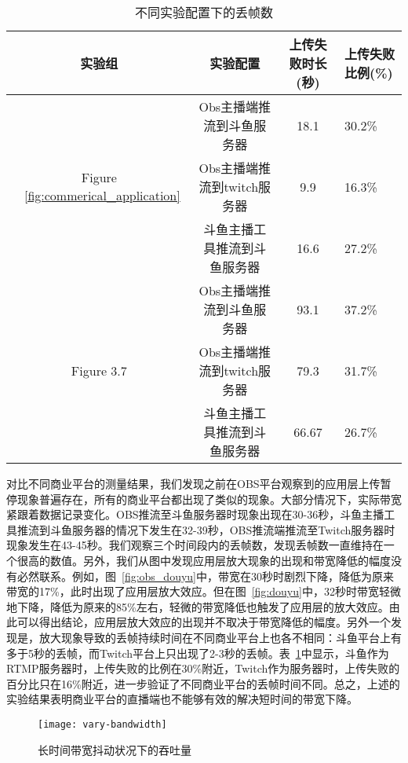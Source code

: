 \begin{table}[h]
\centering
\caption{不同实验配置下的丢帧数}
\label{tb:drop}
{\setlength{\tabcolsep}{4pt}
\begin{tabular}{|c|c|c|l|}
\hline
\textbf{实验组} & \textbf{实验配置} & \textbf{上传失败时长(秒)} & \textbf{上传失败比例(\%)}   \\ \hline
\multirow{3}{*}{Figure ~\ref{fig:commerical_application}}&  Obs主播端推流到斗鱼服务器               & 18.1         & 30.2\%                           \\ \cline{2-4}
& Obs主播端推流到twitch服务器              & 9.9        & 16.3\%    \\ \cline{2-4}
& 斗鱼主播工具推流到斗鱼服务器            & 16.6      & 27.2\% \\ \hline
\multirow{4}{*}{Figure 3.7} & Obs主播端推流到斗鱼服务器            & 93.1      & 37.2\%     \\ \cline{2-4}
& Obs主播端推流到twitch服务器             & 79.3      & 31.7\%  \\ \cline{2-4}
& 斗鱼主播工具推流到斗鱼服务器              & 66.67         & 26.7\%  \\ \hline
\end{tabular}}
\end{table}

对比不同商业平台的测量结果，我们发现之前在OBS平台观察到的应用层上传暂停现象普遍存在，所有的商业平台都出现了类似的现象。大部分情况下，实际带宽紧跟着数据记录变化。OBS推流至斗鱼服务器时现象出现在30-36秒，斗鱼主播工具推流到斗鱼服务器的情况下发生在32-39秒，OBS推流端推流至Twitch服务器时现象发生在43-45秒。我们观察三个时间段内的丢帧数，发现丢帧数一直维持在一个很高的数值。另外，我们从图中发现应用层放大现象的出现和带宽降低的幅度没有必然联系。例如，图~\ref{fig:obs_douyu}中，带宽在30秒时剧烈下降，降低为原来带宽的17\%，此时出现了应用层放大效应。但在图~\ref{fig:douyu}中，32秒时带宽轻微地下降，降低为原来的85\%左右，轻微的带宽降低也触发了应用层的放大效应。由此可以得出结论，应用层放大效应的出现并不取决于带宽降低的幅度。另外一个发现是，放大现象导致的丢帧持续时间在不同商业平台上也各不相同：斗鱼平台上有多于5秒的丢帧，而Twitch平台上只出现了2-3秒的丢帧。表~\ref{tb:drop}中显示，斗鱼作为RTMP服务器时，上传失败的比例在30\%附近，Twitch作为服务器时，上传失败的百分比只在16\%附近，进一步验证了不同商业平台的丢帧时间不同。总之，上述的实验结果表明商业平台的直播端也不能够有效的解决短时间的带宽下降。

\begin{figure}[htb]%
  \centering
  \texttt{[image: vary-bandwidth]}
  \caption{长时间带宽抖动状况下的吞吐量}
  \label{fig:vary-bandwidth}
\end{figure}

